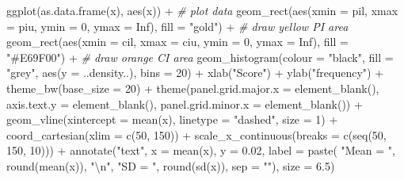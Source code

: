 \documentclass[
]{krantz}
\newenvironment{Shaded}{\begin{snugshade}}{\end{snugshade}}
\newcommand{\AttributeTok}[1]{\textcolor[rgb]{0.77,0.63,0.00}{#1}}
\newcommand{\CommentTok}[1]{\textcolor[rgb]{0.56,0.35,0.01}{\textit{#1}}}
\newcommand{\ConstantTok}[1]{\textcolor[rgb]{0.00,0.00,0.00}{#1}}
\newcommand{\DecValTok}[1]{\textcolor[rgb]{0.00,0.00,0.81}{#1}}
\newcommand{\FloatTok}[1]{\textcolor[rgb]{0.00,0.00,0.81}{#1}}
\newcommand{\FunctionTok}[1]{\textcolor[rgb]{0.00,0.00,0.00}{#1}}
\newcommand{\NormalTok}[1]{#1}
\newcommand{\SpecialCharTok}[1]{\textcolor[rgb]{0.00,0.00,0.00}{#1}}
\newcommand{\StringTok}[1]{\textcolor[rgb]{0.31,0.60,0.02}{#1}}
\begin{document}
\begin{Shaded}
\begin{Highlighting}[]
\FunctionTok{ggplot}\NormalTok{(}\FunctionTok{as.data.frame}\NormalTok{(x), }\FunctionTok{aes}\NormalTok{(x)) }\SpecialCharTok{+} \CommentTok{\# plot data}
  \FunctionTok{geom\_rect}\NormalTok{(}\FunctionTok{aes}\NormalTok{(}\AttributeTok{xmin =}\NormalTok{ pil, }\AttributeTok{xmax =}\NormalTok{ piu, }\AttributeTok{ymin =} \DecValTok{0}\NormalTok{, }\AttributeTok{ymax =} \ConstantTok{Inf}\NormalTok{),}
            \AttributeTok{fill =} \StringTok{"gold"}\NormalTok{) }\SpecialCharTok{+} \CommentTok{\# draw yellow PI area}
  \FunctionTok{geom\_rect}\NormalTok{(}\FunctionTok{aes}\NormalTok{(}\AttributeTok{xmin =}\NormalTok{ cil, }\AttributeTok{xmax =}\NormalTok{ ciu, }\AttributeTok{ymin =} \DecValTok{0}\NormalTok{, }\AttributeTok{ymax =} \ConstantTok{Inf}\NormalTok{),}
            \AttributeTok{fill =} \StringTok{"\#E69F00"}\NormalTok{) }\SpecialCharTok{+} \CommentTok{\# draw orange CI area}
  \FunctionTok{geom\_histogram}\NormalTok{(}\AttributeTok{colour =} \StringTok{"black"}\NormalTok{, }\AttributeTok{fill =} \StringTok{"grey"}\NormalTok{, }\FunctionTok{aes}\NormalTok{(}\AttributeTok{y =}\NormalTok{ ..density..), }\AttributeTok{bins =} \DecValTok{20}\NormalTok{) }\SpecialCharTok{+}
  \FunctionTok{xlab}\NormalTok{(}\StringTok{"Score"}\NormalTok{) }\SpecialCharTok{+}
  \FunctionTok{ylab}\NormalTok{(}\StringTok{"frequency"}\NormalTok{) }\SpecialCharTok{+}
  \FunctionTok{theme\_bw}\NormalTok{(}\AttributeTok{base\_size =} \DecValTok{20}\NormalTok{) }\SpecialCharTok{+}
  \FunctionTok{theme}\NormalTok{(}\AttributeTok{panel.grid.major.x =} \FunctionTok{element\_blank}\NormalTok{(), }\AttributeTok{axis.text.y =} \FunctionTok{element\_blank}\NormalTok{(),}
        \AttributeTok{panel.grid.minor.x =} \FunctionTok{element\_blank}\NormalTok{()) }\SpecialCharTok{+}
  \FunctionTok{geom\_vline}\NormalTok{(}\AttributeTok{xintercept =} \FunctionTok{mean}\NormalTok{(x), }\AttributeTok{linetype =} \StringTok{"dashed"}\NormalTok{, }\AttributeTok{size =} \DecValTok{1}\NormalTok{) }\SpecialCharTok{+}
  \FunctionTok{coord\_cartesian}\NormalTok{(}\AttributeTok{xlim =} \FunctionTok{c}\NormalTok{(}\DecValTok{50}\NormalTok{, }\DecValTok{150}\NormalTok{)) }\SpecialCharTok{+}
  \FunctionTok{scale\_x\_continuous}\NormalTok{(}\AttributeTok{breaks =} \FunctionTok{c}\NormalTok{(}\FunctionTok{seq}\NormalTok{(}\DecValTok{50}\NormalTok{, }\DecValTok{150}\NormalTok{, }\DecValTok{10}\NormalTok{))) }\SpecialCharTok{+}
  \FunctionTok{annotate}\NormalTok{(}\StringTok{"text"}\NormalTok{, }\AttributeTok{x =} \FunctionTok{mean}\NormalTok{(x), }\AttributeTok{y =} \FloatTok{0.02}\NormalTok{, }\AttributeTok{label =} \FunctionTok{paste}\NormalTok{(}
    \StringTok{"Mean = "}\NormalTok{, }\FunctionTok{round}\NormalTok{(}\FunctionTok{mean}\NormalTok{(x)), }\StringTok{"}\SpecialCharTok{\textbackslash{}n}\StringTok{"}\NormalTok{,}
    \StringTok{"SD = "}\NormalTok{, }\FunctionTok{round}\NormalTok{(}\FunctionTok{sd}\NormalTok{(x)), }\AttributeTok{sep =} \StringTok{""}\NormalTok{), }\AttributeTok{size =} \FloatTok{6.5}\NormalTok{)}
\end{Highlighting}
\end{Shaded}
\end{document}
